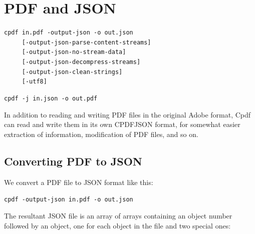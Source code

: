 \documentclass{book}
\begin{document}
\chapter{PDF and JSON}\label{chap:15}\pagestyle{fancy}
  {\small\begin{framed}
  \noindent\verb!cpdf in.pdf -output-json -o out.json!\\
  \noindent\verb!     [-output-json-parse-content-streams]!\\
  \noindent\verb!     [-output-json-no-stream-data]!\\
  \noindent\verb!     [-output-json-decompress-streams]!\\
  \noindent\verb!     [-output-json-clean-strings]!\\
  \noindent\verb!     [-utf8]!

\vspace{1.5mm}

  \noindent\verb!cpdf -j in.json -o out.pdf!
  \end{framed}}

\label{cpdfjson}
In addition to reading and writing PDF files in the original Adobe format, Cpdf can read and write them in its own CPDFJSON format, for somewhat easier extraction of information, modification of PDF files, and so on.

\section{Converting PDF to JSON}

We convert a PDF file to JSON format like this:

  \begin{framed}
  \small\noindent\verb!cpdf -output-json in.pdf -o out.json!
  \end{framed}

\noindent The resultant JSON file is an array of arrays containing an object number followed by an
object, one for each object in the file and two special ones:
\end{document}
